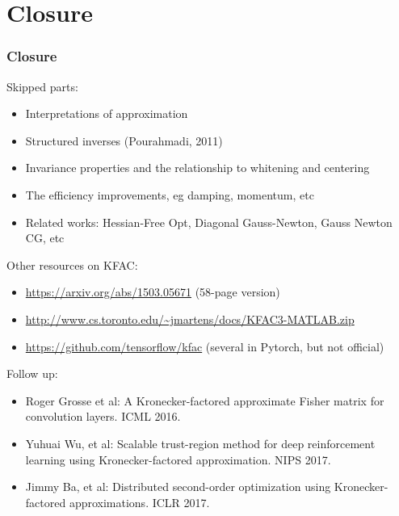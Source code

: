 \section{Closure}

\begin{frame}
\frametitle{Closure}
{\footnotesize

Skipped parts:
\begin{itemize}
\item Interpretations of approximation
\item Structured inverses (Pourahmadi, 2011)
\item Invariance properties and the relationship to whitening and centering
\item The efficiency improvements, eg damping, momentum, etc
\item Related works: Hessian-Free Opt, Diagonal Gauss-Newton, Gauss Newton CG, etc
\end{itemize}

Other resources on KFAC:
\begin{itemize}
\item \url{https://arxiv.org/abs/1503.05671} (58-page version)
\item \url{http://www.cs.toronto.edu/~jmartens/docs/KFAC3-MATLAB.zip}
\item \url{https://github.com/tensorflow/kfac} (several in Pytorch, but not official)
\end{itemize}

Follow up:
\begin{itemize}
\item Roger Grosse et al: A Kronecker-factored approximate Fisher matrix for convolution layers. ICML 2016.
\item Yuhuai Wu, et al: Scalable trust-region method for deep reinforcement learning using Kronecker-factored approximation. NIPS 2017.
\item Jimmy Ba, et al: Distributed second-order optimization using Kronecker-factored approximations. ICLR 2017.
\end{itemize}

}
\end{frame}

